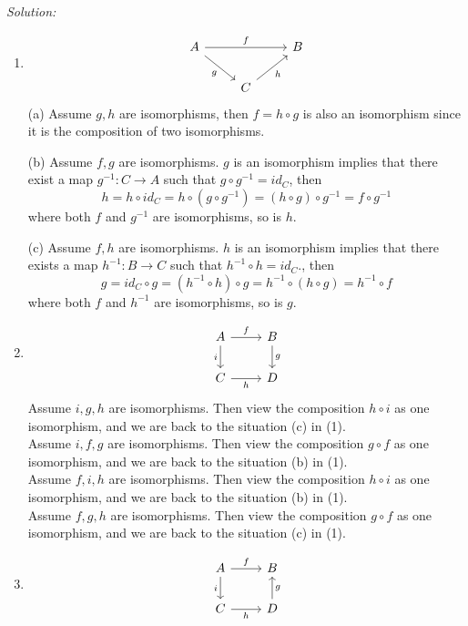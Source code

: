 \documentclass[a4paper, 12pt]{article}
\newenvironment{solution}
    {\textit{Solution:}}
    {}
\begin{document}
\begin{solution}
\begin{enumerate}[(1)]
\item \[\begin{tikzcd}
	A && B \\
	& C
	\arrow["f", from=1-1, to=1-3]
	\arrow["g"', from=1-1, to=2-2]
	\arrow["h"', from=2-2, to=1-3]
\end{tikzcd}\]
(a) Assume \(g,h\) are isomorphisms, then \(f=h\circ g\) is also an isomorphism since it is the composition of two isomorphisms. 
\par 
(b) Assume \(f,g\) are isomorphisms. \(g\) is an isomorphism implies that there exist a map \(g^{-1}:C\rightarrow A\) such that \(g\circ g^{-1}=id_C\), then 
\[h=h\circ id_C=h\circ (g\circ g^{-1})=(h\circ g)\circ g^{-1}=f\circ g^{-1}\]
where both \(f\) and \(g^{-1}\) are isomorphisms, so is \(h\).
\par 
(c) Assume \(f,h\) are isomorphisms. \(h\) is an isomorphism implies that there exists a map \(h^{-1}:B\rightarrow C\) such that \(h^{-1}\circ h=id_C\)., then 
\[g=id_C\circ g=(h^{-1}\circ h)\circ g=h^{-1}\circ (h\circ g)=h^{-1}\circ f\]
where both \(f\) and \(h^{-1}\) are isomorphisms, so is \(g\).
\item \[\begin{tikzcd}
	A & B \\
	C & D
	\arrow["f", from=1-1, to=1-2]
	\arrow["i"', from=1-1, to=2-1]
	\arrow["g", from=1-2, to=2-2]
	\arrow["h"', from=2-1, to=2-2]
\end{tikzcd}\]
Assume \(i,g,h\) are isomorphisms. Then view the composition \(h\circ i\) as one isomorphism, and we are back to the situation (c) in (1).\\ 
Assume \(i,f,g\) are isomorphisms. Then view the composition \(g\circ f\) as one isomorphism, and we are back to the situation (b) in (1).\\
Assume \(f,i,h\) are isomorphisms. Then view the composition \(h\circ i\) as one isomorphism, and we are back to the situation (b) in (1).\\ 
Assume \(f,g,h\) are isomorphisms. Then view the composition \(g\circ f\) as one isomorphism, and we are back to the situation (c) in (1).
\item \[\begin{tikzcd}
	A & B \\
	C & D
	\arrow["f", from=1-1, to=1-2]
	\arrow["i"', from=1-1, to=2-1]
	\arrow["h"', from=2-1, to=2-2]
	\arrow["g"', from=2-2, to=1-2]
\end{tikzcd}\]

\end{enumerate}
\end{solution}
\end{document}
